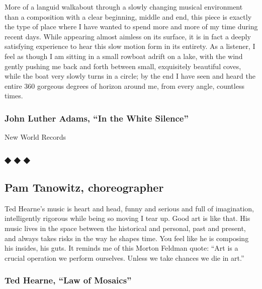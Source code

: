 More of a languid walkabout through a slowly changing musical
environment than a composition with a clear beginning, middle and end,
this piece is exactly the type of place where I have wanted to spend
more and more of my time during recent days. While appearing almost
aimless on its surface, it is in fact a deeply satisfying experience to
hear this slow motion form in its entirety. As a listener, I feel as
though I am sitting in a small rowboat adrift on a lake, with the wind
gently pushing me back and forth between small, exquisitely beautiful
coves, while the boat very slowly turns in a circle; by the end I have
seen and heard the entire 360 gorgeous degrees of horizon around me,
from every angle, countless times.

\hypertarget{john-luther-adams-in-the-white-silence}{%
\subsubsection{John Luther Adams, ``In the White
Silence''}\label{john-luther-adams-in-the-white-silence}}

New World Records

\hypertarget{---7}{%
\subsubsection{◆ ◆ ◆}\label{---7}}

\hypertarget{pam-tanowitz-choreographer}{%
\subsection{Pam Tanowitz,
choreographer}\label{pam-tanowitz-choreographer}}

Ted Hearne's music is heart and head, funny and serious and full of
imagination, intelligently rigorous while being so moving I tear up.
Good art is like that. His music lives in the space between the
historical and personal, past and present, and always takes risks in the
way he shapes time. You feel like he is composing his insides, his guts.
It reminds me of this Morton Feldman quote: ``Art is a crucial operation
we perform ourselves. Unless we take chances we die in art.''

\hypertarget{ted-hearne-law-of-mosaics}{%
\subsubsection{Ted Hearne, ``Law of
Mosaics''}\label{ted-hearne-law-of-mosaics}}

